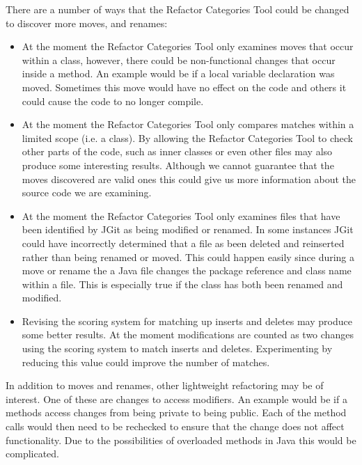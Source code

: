 There are a number of ways that the Refactor Categories Tool could be changed to discover more moves, and renames:

\begin{itemize}

  \item At the moment the Refactor Categories Tool only examines moves that occur within a class, however, there could be non-functional changes that occur inside a method. 
An example would be if a local variable declaration was moved.
Sometimes this move would have no effect on the code and others it could cause the code to no longer compile.
  
  \item At the moment the Refactor Categories Tool only compares matches within a limited scope (i.e. a class).  
  By allowing the Refactor Categories Tool to check other parts of the code, such as inner classes or even other files may also produce some interesting results.
Although we cannot guarantee that the moves discovered are valid ones this could give us more information about the source code we are examining.

  \item At the moment the Refactor Categories Tool only examines files that have been identified by JGit as being modified or renamed.
In some instances JGit could have incorrectly determined that a file as been deleted and reinserted rather than being renamed or moved.
This could happen easily since during a move or rename the a Java file changes the package reference and class name within a file.
This is especially true if the class has both been renamed and modified.

  \item Revising the scoring system for matching up inserts and deletes may produce some better results.
At the moment modifications are counted as two changes using the scoring system to match inserts and deletes.
Experimenting by reducing this value could improve the number of matches.

\end{itemize}




   

In addition to moves and renames, other lightweight refactoring may be of interest.
One of these are changes to access modifiers.
An example would be if a methods access changes from being private to being public.
Each of the method calls would then need to be rechecked to ensure that the change does not affect functionality.
Due to the possibilities of overloaded methods in Java this would be complicated.

